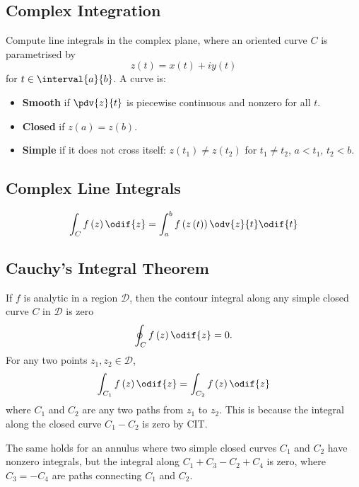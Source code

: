 \documentclass{article}
\begin{document}
\begin{multicols*}{3}
    \subsection{Complex Integration}
    Compute line integrals in the complex plane,
    where an oriented curve \(C\) is parametrised by
    \begin{equation*}
        z\left( t \right) = x\left( t \right) + i y\left( t \right)
    \end{equation*}
    for \(t \in \interval{a}{b}\). A curve is:
    \begin{itemize}
        \item \textbf{Smooth} if \(\pdv{z}{t}\) is piecewise continuous and nonzero for all \(t\).
        \item \textbf{Closed} if \(z\left( a \right) = z\left( b \right)\).
        \item \textbf{Simple} if it does not cross itself: \(z\left( t_1 \right) \neq z\left( t_2 \right)\) for \(t_1 \neq t_2\), \(a < t_1\), \(t_2 < b\).
    \end{itemize}
    \subsection{Complex Line Integrals}
    \begin{equation*}
        \int_C f\left( z \right) \odif{z} = \int_a^b f\left( z\left( t \right) \right) \odv{z}{t} \odif{t}
    \end{equation*}
    \subsection{Cauchy's Integral Theorem}
    If \(f\) is analytic in a region \(\mathcal{D}\), then
    the contour integral along any simple closed curve \(C\) in \(\mathcal{D}\) is zero
    \begin{equation*}
        \oint_C f\left( z \right) \odif{z} = 0.
    \end{equation*}
    For any two points \(z_1, z_2 \in \mathcal{D}\),
    \begin{equation*}
        \int_{C_1} f\left( z \right) \odif{z} = \int_{C_2} f\left( z \right) \odif{z}
    \end{equation*}
    where \(C_1\) and \(C_2\) are any two paths from \(z_1\) to \(z_2\).
    This is because the integral along the closed curve \(C_1 - C_2\) is zero by CIT.

    The same holds for an annulus where two simple closed curves \(C_1\) and \(C_2\)
    have nonzero integrals, but the integral along \(C_1 + C_3 - C_2 + C_4\) is zero,
    where \(C_3 = -C_4\) are paths connecting \(C_1\) and \(C_2\).

\end{multicols*}
\end{document}
